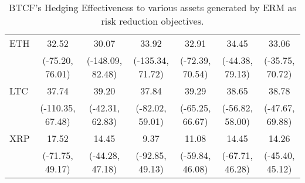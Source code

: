 \begin{table}[t]
{\begin{tabular}{lcccccc}
ETH     &             32.52 &              30.07 &             33.92 &             32.91 &             34.45 &             33.06 \\
        &   (-75.20, 76.01) &   (-148.09, 82.48) &  (-135.34, 71.72) &   (-72.39, 70.54) &   (-44.38, 79.13) &   (-35.75, 70.72) \\
LTC     &             37.74 &              39.20 &             37.84 &             39.29 &             38.65 &             38.78 \\
        &  (-110.35, 67.48) &    (-42.31, 62.83) &   (-82.02, 59.01) &   (-65.25, 66.67) &   (-56.82, 58.00) &   (-47.67, 69.88) \\
XRP     &             17.52 &              14.45 &              9.37 &             11.08 &             14.45 &             14.26 \\
        &   (-71.75, 49.17) &    (-44.28, 47.18) &   (-92.85, 49.13) &   (-59.84, 46.08) &   (-67.71, 46.28) &   (-45.40, 45.12) \\
\bottomrule
\end{tabular}}
\caption{BTCF's Hedging Effectiveness to various assets generated by ERM as risk reduction objectives.}
\label{tab:ERMHE}
\end{table}